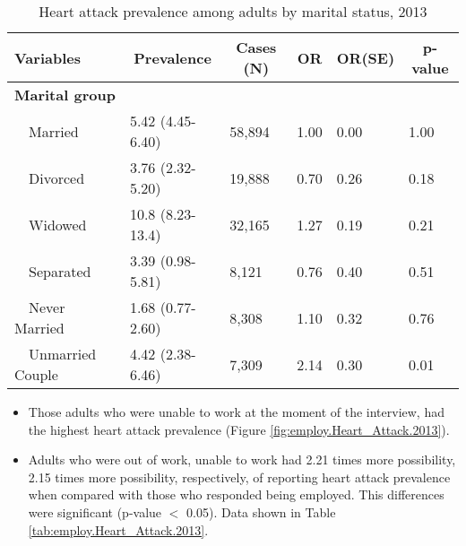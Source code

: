 \begin{table}[H]
\caption{Heart attack prevalence  among adults by marital status, 2013\label{tab:marital.Heart_Attack.2013}} 
\begin{center}
\begin{tabular}{llllll}
\hline\hline
\multicolumn{1}{l}{Variables}&\multicolumn{1}{c}{Prevalence}&\multicolumn{1}{c}{Cases (N)}&\multicolumn{1}{c}{OR}&\multicolumn{1}{c}{OR(SE)}&\multicolumn{1}{c}{p-value}\tabularnewline
\hline
{\bfseries Marital group}&&&&&\tabularnewline
~~Married&5.42 (4.45-6.40)&58,894&1.00&0.00&1.00\tabularnewline
~~Divorced&3.76 (2.32-5.20)&19,888&0.70&0.26&0.18\tabularnewline
~~Widowed&10.8 (8.23-13.4)&32,165&1.27&0.19&0.21\tabularnewline
~~Separated&3.39 (0.98-5.81)& 8,121&0.76&0.40&0.51\tabularnewline
~~Never Married&1.68 (0.77-2.60)& 8,308&1.10&0.32&0.76\tabularnewline
~~Unmarried Couple&4.42 (2.38-6.46)& 7,309&2.14&0.30&0.01\tabularnewline
\hline
\end{tabular}\end{center}

\end{table}

 
 \newpage
\begin{itemize}


\item Those adults who were 
unable to work at the moment of the interview, had the highest heart attack prevalence (Figure \ref{fig:employ.Heart_Attack.2013}).

\item Adults who were out of work, unable to work had 2.21 times more possibility, 2.15 times more possibility, respectively, of reporting heart attack prevalence when compared with those who responded being employed. This differences were significant (p-value $<$ 0.05). 
Data shown in Table \ref{tab:employ.Heart_Attack.2013}.


\end{itemize}

